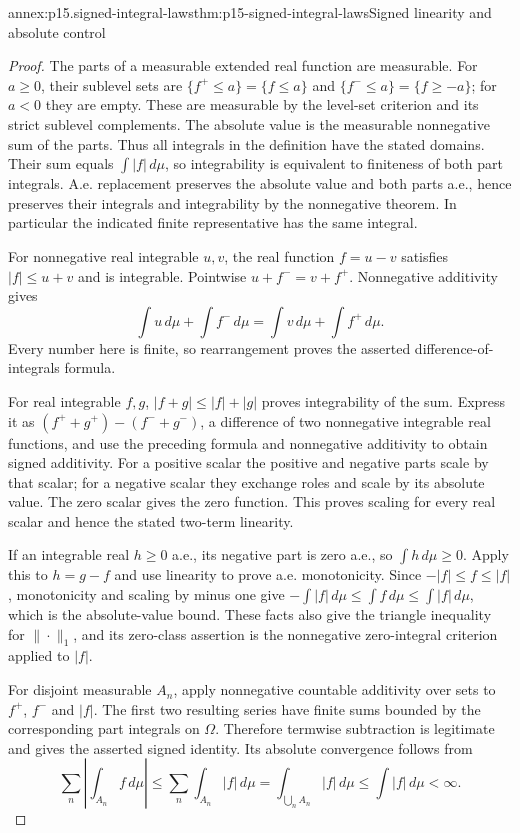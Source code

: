 \begin{annexitem}{annex:p15.signed-integral-laws}{thm:p15-signed-integral-laws}{Signed linearity and absolute control}
\begin{proof}
The parts of a measurable extended real function are measurable.
For \(a\geq0\), their sublevel sets are
\(\{f^+\leq a\}=\{f\leq a\}\) and
\(\{f^-\leq a\}=\{f\geq-a\}\); for \(a<0\) they are
empty. These are measurable by the level-set criterion and its strict
sublevel complements. The absolute value is the measurable nonnegative
sum of the parts. Thus all integrals in the definition have the stated
domains. Their sum equals \(\int|f|\,d\mu\), so integrability
is equivalent to finiteness of both part integrals. A.e. replacement
preserves the absolute value and both parts a.e., hence preserves their
integrals and integrability by the nonnegative theorem. In particular
the indicated finite representative has the same integral.

For nonnegative real integrable \(u,v\), the real function
\(f=u-v\) satisfies \(|f|\leq u+v\) and is integrable.
Pointwise \(u+f^-=v+f^+\). Nonnegative additivity gives
\[
 \int u\,d\mu+\int f^-\,d\mu
       =\int v\,d\mu+\int f^+\,d\mu.
\]
Every number here is finite, so rearrangement proves the asserted
difference-of-integrals formula.

For real integrable \(f,g\),
\(|f+g|\leq|f|+|g|\) proves integrability of the sum. Express it
as \((f^++g^+)-(f^-+g^-)\), a difference of two nonnegative
integrable real functions, and use the preceding formula and
nonnegative additivity to obtain signed additivity. For a positive
scalar the positive and negative parts scale by that scalar; for
a negative scalar they exchange roles and scale by its absolute value.
The zero scalar gives the zero function. This proves scaling for every
real scalar and hence the stated two-term linearity.

If an integrable real \(h\geq0\) a.e., its negative part is zero
a.e., so \(\int h\,d\mu\geq0\). Apply this to \(h=g-f\)
and use linearity to prove a.e. monotonicity. Since
\(-|f|\leq f\leq|f|\), monotonicity and scaling by minus one give
\(-\int|f|\,d\mu\leq\int f\,d\mu\leq\int|f|\,d\mu\),
which is the absolute-value bound. These facts also give the triangle
inequality for \(\|\cdot\|_1\), and its zero-class assertion is
the nonnegative zero-integral criterion applied to \(|f|\).

For disjoint measurable \(A_n\), apply nonnegative countable
additivity over sets to \(f^+\), \(f^-\) and \(|f|\). The
first two resulting series have finite sums bounded by the corresponding
part integrals on \(\Omega\). Therefore termwise subtraction is
legitimate and gives the asserted signed identity. Its absolute
convergence follows from
\[
 \sum_n\left|\int_{A_n}f\,d\mu\right|
       \leq\sum_n\int_{A_n}|f|\,d\mu
       =\int_{\bigcup_n A_n}|f|\,d\mu
       \leq\int|f|\,d\mu<\infty.
\]
\end{proof}
\end{annexitem}

